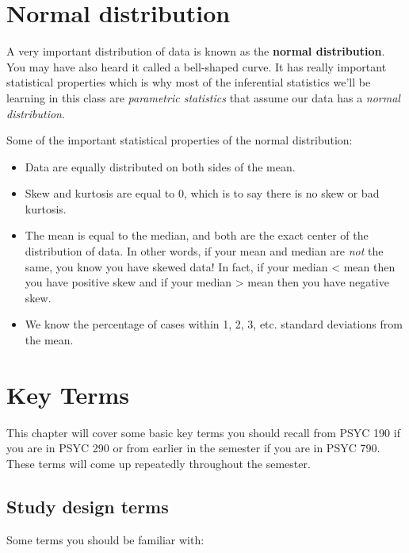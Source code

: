 \documentclass[
]{book}
\begin{document}
\hypertarget{normal-distribution}{%
\section{Normal distribution}\label{normal-distribution}}

A very important distribution of data is known as the \textbf{normal distribution}. You may have also heard it called a bell-shaped curve. It has really important statistical properties which is why most of the inferential statistics we'll be learning in this class are \emph{parametric statistics} that assume our data has a \emph{normal distribution}.

Some of the important statistical properties of the normal distribution:

\begin{itemize}
\item
  Data are equally distributed on both sides of the mean.
\item
  Skew and kurtosis are equal to 0, which is to say there is no skew or bad kurtosis.
\item
  The mean is equal to the median, and both are the exact center of the distribution of data. In other words, if your mean and median are \emph{not} the same, you know you have skewed data! In fact, if your median \textless{} mean then you have positive skew and if your median \textgreater{} mean then you have negative skew.
\item
  We know the percentage of cases within 1, 2, 3, etc. standard deviations from the mean.
\end{itemize}

\hypertarget{key-terms}{%
\section{Key Terms}\label{key-terms}}

This chapter will cover some basic key terms you should recall from PSYC 190 if you are in PSYC 290 or from earlier in the semester if you are in PSYC 790. These terms will come up repeatedly throughout the semester.

\hypertarget{study-design-terms}{%
\subsection{Study design terms}\label{study-design-terms}}

Some terms you should be familiar with:
\end{document}
